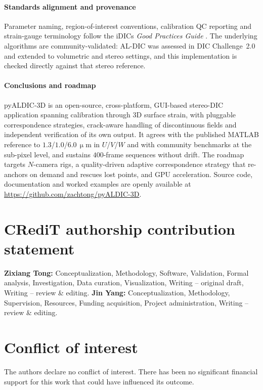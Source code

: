 \paragraph{Standards alignment and provenance} Parameter naming, region-of-interest conventions, calibration QC reporting and strain-gauge terminology follow the iDICs \emph{Good Practices Guide} \cite{idics2018gpg,idics2025gpg}. The underlying algorithms are community-validated: AL-DIC \cite{yang2019augmented} was assessed in DIC Challenge~2.0 \cite{reu2022dicchallenge2} and extended to volumetric \cite{yang2020augmented} and stereo \cite{tong2025stereo} settings, and this implementation is checked directly against that stereo reference.

\paragraph{Conclusions and roadmap} pyALDIC-3D is an open-source, cross-platform, GUI-based stereo-DIC application spanning calibration through 3D surface strain, with pluggable correspondence strategies, crack-aware handling of discontinuous fields and independent verification of its own output. It agrees with the published MATLAB reference to $1.3$/$1.0$/$6.0\,\upmu$m in $U$/$V$/$W$ and with community benchmarks at the sub-pixel level, and sustains $400$-frame sequences without drift. The roadmap targets $N$-camera rigs, a quality-driven adaptive correspondence strategy that re-anchors on demand and rescues lost points, and GPU acceleration. Source code, documentation and worked examples are openly available at \url{https://github.com/zachtong/pyALDIC-3D}.

\section*{CRediT authorship contribution statement}
\textbf{Zixiang Tong:} Conceptualization, Methodology, Software, Validation, Formal analysis, Investigation, Data curation, Visualization, Writing -- original draft, Writing -- review \& editing. \textbf{Jin Yang:} Conceptualization, Methodology, Supervision, Resources, Funding acquisition, Project administration, Writing -- review \& editing.

\section*{Conflict of interest}
The authors declare no conflict of interest. There has been no significant financial support for this work that could have influenced its outcome.

